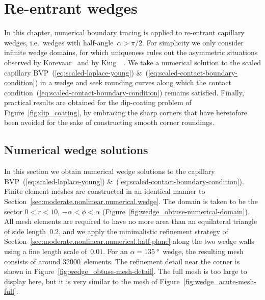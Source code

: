 \chapter{Re-entrant wedges}
\label{ch:re-entrant}

In this chapter,
numerical boundary tracing is applied to re-entrant capillary wedges,
i.e.~wedges with half-angle~$\alpha > \pi/2$.
For simplicity we only consider infinite wedge domains,
for which uniqueness rules out the asymmetric situations observed by
Korevaar~\cite{korevaar-1980-capillary-re-entrant-corner}
and by King~\etal~\cite{king-1999-laplace-young-near-corner}.
We take a numerical solution to
the scaled capillary BVP~(\ref{eq:scaled-laplace-young})
\&~(\ref{eq:scaled-contact-boundary-condition})
in a wedge
and seek rounding curves along which
the contact condition~(\ref{eq:scaled-contact-boundary-condition})
remains satisfied.
Finally, practical results are obtained for the dip-coating problem
of Figure~\ref{fig:dip_coating},
by embracing the sharp corners
that have heretofore been avoided
for the sake of constructing smooth corner roundings.

\section{Numerical wedge solutions}
\label{sec:re-entrant.numerical}

In this section we obtain numerical wedge solutions
to the capillary BVP~(\ref{eq:scaled-laplace-young})
\&~(\ref{eq:scaled-contact-boundary-condition}).
Finite element meshes are constructed in an identical manner
to Section~\ref{sec:moderate.nonlinear.numerical.wedge}.
The domain is taken to be the sector $0 < r < 10$, $-\alpha < \phi < \alpha$
(Figure~\ref{fig:wedge_obtuse-numerical-domain}).
All mesh elements are required to have no more area
than an equilateral triangle of side length~$0.2$,
and we apply the minimalistic refinement strategy
of Section~\ref{sec:moderate.nonlinear.numerical.half-plane}
along the two wedge walls
using a fine length scale of~$0.01$.
For an $\alpha = \SI{135}{\degree}$~wedge,
the resulting mesh consists of around 32000~elements.
The refinement detail near the corner
is shown in Figure~\ref{fig:wedge_obtuse-mesh-detail}.
The full mesh is too large to display here,
but it is very similar to the mesh of Figure~\ref{fig:wedge_acute-mesh-full}.

\begin{figure}
  \begin{minipage}[t]{0.48\textwidth}
  \end{minipage}
  \hfill
  \begin{minipage}[t]{0.48\textwidth}
  \end{minipage}
\end{figure}

